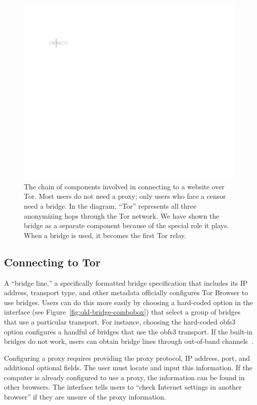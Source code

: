 \documentclass[USenglish,oneside,twocolumn]{article}
\begin{document}
\begin{figure}
\centering
\includegraphics{topology.pdf}
\caption{
The chain of components involved in connecting to a website over Tor.
Most users do not need a proxy;
only users who face a censor need a bridge.
In the diagram, ``Tor'' represents all three anonymizing hops through the Tor network.
We have shown the bridge as a separate component
because of the special role it plays.
When a bridge is used, it becomes the first Tor relay.
}
\label{fig:topology}
\end{figure}

\subsection{Connecting to Tor} 
A ``bridge line,'' a specifically formatted bridge specification that
includes its IP address, transport type, and other metadata 
officially configures Tor Browser to use bridges.
Users can do this more easily by choosing
a hard-coded option in the interface (see Figure~\ref{fig:old-bridge-combobox}) 
that select a group of bridges that use a particular transport.
For instance, choosing the hard-coded obfs3 option
configures a handful of bridges that use the obfs3 transport.
If the built-in bridges do not work, users can obtain bridge lines
through out-of-band channels~\cite{bridgedb}.

Configuring a proxy requires providing the proxy protocol, IP address, port, and additional optional fields. The user must locate and input this information. If the computer is already configured to use a proxy, the information can be found in other browsers. The interface tells users to ``check Internet settings in another browser'' if they are unsure of the proxy information. 
\end{document}
